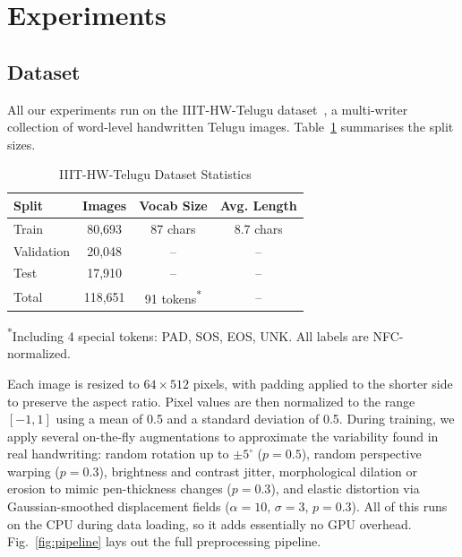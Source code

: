 \documentclass[conference]{IEEEtran}
\begin{document}
\section{Experiments}

\subsection{Dataset}

All our experiments run on the IIIT-HW-Telugu dataset~\cite{dutta2018, gongidi2021iiit}, a multi-writer collection of word-level handwritten Telugu images. Table~\ref{tab:dataset} summarises the split sizes.

\begin{table}[htbp]
\centering
\caption{IIIT-HW-Telugu Dataset Statistics}
\label{tab:dataset}
\begin{tabular}{lccc}
\toprule
\textbf{Split} & \textbf{Images} & \textbf{Vocab Size} & \textbf{Avg. Length} \\
\midrule
Train & 80,693 & 87 chars & 8.7 chars \\
Validation & 20,048 & -- & -- \\
Test & 17,910 & -- & -- \\
\midrule
Total & 118,651 & 91 tokens\textsuperscript{*} & -- \\
\bottomrule
\end{tabular}
\vspace{2pt}
\raggedright\small\textsuperscript{*}Including 4 special tokens: PAD, SOS, EOS, UNK. All labels are NFC-normalized.
\end{table}

Each image is resized to $64 \times 512$ pixels, with padding applied to the shorter side to preserve the aspect ratio. Pixel values are then normalized to the range $[-1, 1]$ using a mean of 0.5 and a standard deviation of 0.5. During training, we apply several on-the-fly augmentations to approximate the variability found in real handwriting: random rotation up to $\pm 5^{\circ}$ ($p{=}0.5$), random perspective warping ($p{=}0.3$), brightness and contrast jitter, morphological dilation or erosion to mimic pen-thickness changes ($p{=}0.3$), and elastic distortion via Gaussian-smoothed displacement fields ($\alpha{=}10$, $\sigma{=}3$, $p{=}0.3$). All of this runs on the CPU during data loading, so it adds essentially no GPU overhead. Fig.~\ref{fig:pipeline} lays out the full preprocessing pipeline.
\end{document}
